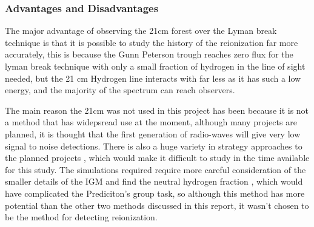 
         \subsubsection{Advantages and Disadvantages} %
	\label{subsub:Advantages_disadvantages_21cm}
The major advantage of observing the 21cm forest over the Lyman break technique is that it is possible to study the history of the reionization far more accurately, this is because the Gunn Peterson trough reaches zero flux for the lyman break technique with only a small fraction of hydrogen in the line of sight needed, but the 21 cm Hydrogen line interacts with far less as it has such a low energy, and the majority of the spectrum can reach observers. 

The main reason the 21cm was not used in this project has been because it is not a method that has widepsread use at the moment, although many projects are planned, it is thought that the first generation of radio-waves will give very low signal to noise detections. There is also a huge variety in strategy approaches to the planned projects \cite[2]{parsons2012sensitivity}, which would make it difficult to study in the time available for this study. The simulations required require more careful consideration of the smaller details of the IGM and find the neutral hydrogen fraction \cite[1]{mcgreer2011first}, which would have complicated the Prediciton's group task,  so although this method has more potential than the other two methods discussed in this report, it wasn't chosen to be the method for detecting reionization. 

    
